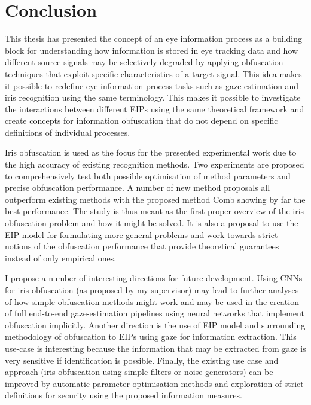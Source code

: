 \chapter{Conclusion}
This thesis has presented the concept of an eye information process as a building block for understanding how information is stored in eye tracking data and how different source signals may be selectively degraded by applying obfuscation techniques that exploit specific characteristics of a target signal. This idea makes it possible to redefine eye information process tasks such as gaze estimation and iris recognition using the same terminology. This makes it possible to investigate the interactions between different EIPs using the same theoretical framework and create concepts for information obfuscation that do not depend on specific definitions of individual processes.

Iris obfuscation is used as the focus for the presented experimental work due to the high accuracy of existing recognition methods. Two experiments are proposed to comprehensively test both possible optimisation of method parameters and precise obfuscation performance. A number of new method proposals all outperform existing methods with the proposed method Comb showing by far the best performance. The study is thus meant as the first proper overview of the iris obfuscation problem and how it might be solved. It is also a proposal to use the EIP model for formulating more general problems and work towards strict notions of the obfuscation performance that provide theoretical guarantees instead of only empirical ones.

I propose a number of interesting directions for future development. Using CNNs for iris obfuscation (as proposed by my supervisor) may lead to further analyses of how simple obfuscation methods might work and may be used in the creation of full end-to-end gaze-estimation pipelines using neural networks that implement obfuscation implicitly. Another direction is the use of EIP model and surrounding methodology of obfuscation to EIPs using gaze for information extraction. This use-case is interesting because the information that may be extracted from gaze is very sensitive if identification is possible. Finally, the existing use case and approach (iris obfuscation using simple filters or noise generators) can be improved by automatic parameter optimisation methods and exploration of strict definitions for security using the proposed information measures.



